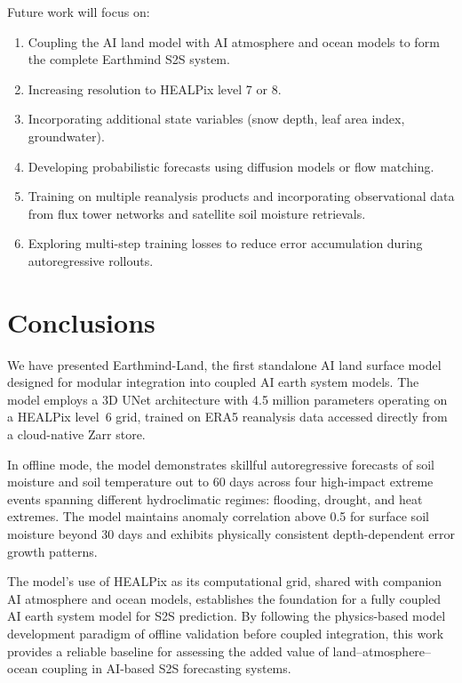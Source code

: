 \documentclass[11pt]{article}
\begin{document}
Future work will focus on:
\begin{enumerate}
    \item Coupling the AI land model with AI atmosphere and ocean models to form the complete Earthmind S2S system.
    \item Increasing resolution to HEALPix level 7 or 8.
    \item Incorporating additional state variables (snow depth, leaf area index, groundwater).
    \item Developing probabilistic forecasts using diffusion models or flow matching.
    \item Training on multiple reanalysis products and incorporating observational data from flux tower networks and satellite soil moisture retrievals.
    \item Exploring multi-step training losses to reduce error accumulation during autoregressive rollouts.
\end{enumerate}

\section{Conclusions}
\label{sec:conclusions}

We have presented Earthmind-Land, the first standalone AI land surface model designed for modular integration into coupled AI earth system models. The model employs a 3D UNet architecture with 4.5 million parameters operating on a HEALPix level~6 grid, trained on ERA5 reanalysis data accessed directly from a cloud-native Zarr store.

In offline mode, the model demonstrates skillful autoregressive forecasts of soil moisture and soil temperature out to 60 days across four high-impact extreme events spanning different hydroclimatic regimes: flooding, drought, and heat extremes. The model maintains anomaly correlation above 0.5 for surface soil moisture beyond 30 days and exhibits physically consistent depth-dependent error growth patterns.

The model's use of HEALPix as its computational grid, shared with companion AI atmosphere and ocean models, establishes the foundation for a fully coupled AI earth system model for S2S prediction. By following the physics-based model development paradigm of offline validation before coupled integration, this work provides a reliable baseline for assessing the added value of land--atmosphere--ocean coupling in AI-based S2S forecasting systems.
\end{document}

